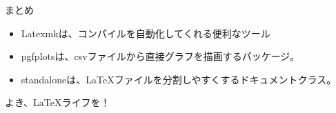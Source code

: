 \documentclass[dvipdfmx,12pt,beamer]{standalone}
\begin{document}
\begin{frame}{まとめ}
	\begin{itemize}
		\item Latexmkは、コンパイルを自動化してくれる便利なツール
		\item pgfplotsは、csvファイルから直接グラフを描画するパッケージ。
		\item standaloneは、\LaTeX ファイルを分割しやすくするドキュメントクラス。
	\end{itemize}

	\begin{block}{よき、\LaTeX ライフを！}
	\end{block}
\end{frame}
\end{document}
